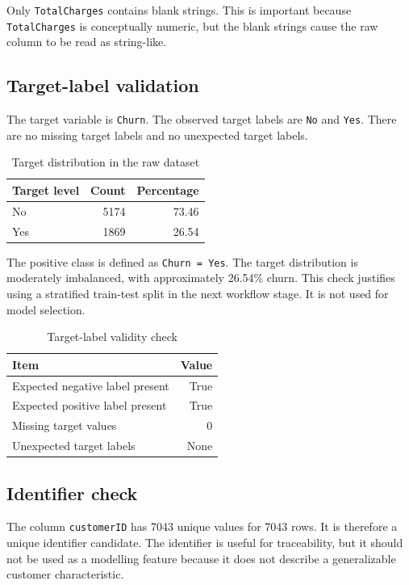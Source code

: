 Only \texttt{TotalCharges} contains blank strings. This is important because \texttt{TotalCharges} is conceptually numeric, but the blank strings cause the raw column to be read as string-like.

\subsection{Target-label validation}

The target variable is \texttt{Churn}. The observed target labels are \texttt{No} and \texttt{Yes}. There are no missing target labels and no unexpected target labels.

\begin{table}[H]
\centering
\caption{Target distribution in the raw dataset}
\label{tab:target-distribution}
\begin{tabular}{lrr}
\toprule
Target level & Count & Percentage \\
\midrule
No & 5174 & 73.46 \\
Yes & 1869 & 26.54 \\
\bottomrule
\end{tabular}
\end{table}

The positive class is defined as \texttt{Churn = Yes}. The target distribution is moderately imbalanced, with approximately 26.54\% churn. This check justifies using a stratified train-test split in the next workflow stage. It is not used for model selection.

\begin{table}[H]
\centering
\caption{Target-label validity check}
\label{tab:target-validity}
\begin{tabular}{lr}
\toprule
Item & Value \\
\midrule
Expected negative label present & True \\
Expected positive label present & True \\
Missing target values & 0 \\
Unexpected target labels & None \\
\bottomrule
\end{tabular}
\end{table}

\subsection{Identifier check}

The column \texttt{customerID} has 7043 unique values for 7043 rows. It is therefore a unique identifier candidate. The identifier is useful for traceability, but it should not be used as a modelling feature because it does not describe a generalizable customer characteristic.


